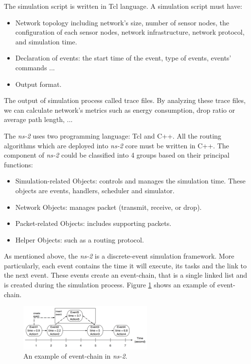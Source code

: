 The simulation script is written in Tcl language. A simulation script must have:
\begin{itemize}
\item Network topology including network's size, number of sensor nodes, the configuration of each sensor nodes, network infrastructure, network protocol, and simulation time.
\item Declaration of events: the start time of the event, type of events, events' commands ...
\item Output format.
\end{itemize}
The output of simulation process called trace files. By analyzing these trace files, we can calculate network's metrics such as energy consumption, drop ratio or average path length, ...

The \emph{ns-2} uses two programming language: Tcl and C++. All the routing algorithms which are deployed into \emph{ns-2} core must be written in C++. The component of \emph{ns-2} could be classified into 4 groups based on their principal functions:
\begin{itemize}
\item Simulation-related Objects: controls and manages the simulation time. These objects are events, handlers, scheduler and simulator.
\item Network Objects: manages packet (transmit, receive, or drop).
\item Packet-related Objects: includes supporting packets.
\item Helper Objects: such as a routing protocol.
\end{itemize} 
As mentioned above, the \emph{ns-2} is a discrete-event simulation framework. More particularly, each event contains the time it will execute, its tasks and the link to the next event. These events create an event-chain, that is a single linked list and is created during the simulation process. Figure \ref{fig-ns2-event} shows an example of event-chain. 
\begin{figure}[!htb]
\centering
\includegraphics[width=0.6\textwidth]{Chapter5/Chapter5Figs/fig-ns2-event.png}
\caption{An example of event-chain in \emph{ns-2}.}
\label{fig-ns2-event}
\end{figure}

